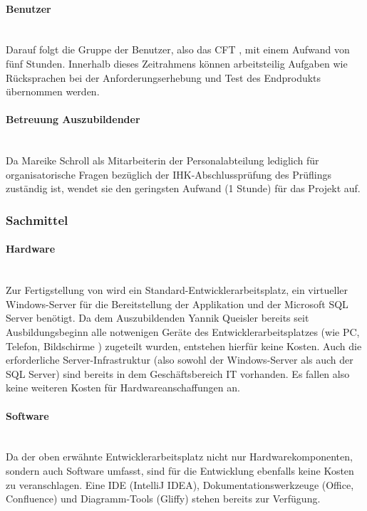 \paragraph{Benutzer} ~\\
\label{p:Benutzer}
Darauf folgt die Gruppe der Benutzer, also das \ac{CFT} \teamName, mit einem Aufwand von fünf Stunden. Innerhalb dieses Zeitrahmens können arbeitsteilig Aufgaben wie Rücksprachen bei der Anforderungserhebung und Test des Endprodukts übernommen werden.

\paragraph{Betreuung Auszubildender} ~\\
\label{p:Betreuung}
Da Mareike Schroll als Mitarbeiterin der Personalabteilung lediglich für organisatorische Fragen bezüglich der IHK-Abschlussprüfung des Prüflings zuständig ist, wendet sie den geringsten Aufwand (1 Stunde) für das Projekt auf.

\subsubsection{Sachmittel}
\label{sec:Sachmittel}

\paragraph{Hardware} ~\\
\label{p:Hardware}
Zur Fertigstellung von \projektName wird ein Standard-Entwicklerarbeitsplatz, ein virtueller Windows-Server für die Bereitstellung der Applikation und der Microsoft SQL Server benötigt. Da dem Auszubildenden Yannik Queisler bereits seit Ausbildungsbeginn alle notwenigen Geräte des Entwicklerarbeitsplatzes (wie PC, Telefon, Bildschirme \etc) zugeteilt wurden, entstehen hierfür keine Kosten. Auch die erforderliche Server-Infrastruktur (also sowohl der Windows-Server als auch der SQL Server) sind bereits in dem Geschäftsbereich IT vorhanden. Es fallen also keine weiteren Kosten für Hardwareanschaffungen an.

\paragraph{Software} ~\\
\label{p:Software}
Da der oben erwähnte Entwicklerarbeitsplatz nicht nur Hardwarekomponenten, sondern auch Software umfasst, sind für die Entwicklung ebenfalls keine Kosten zu veranschlagen. Eine \ac{IDE} (IntelliJ IDEA), Dokumentationswerkzeuge (Office, Confluence) und Diagramm-Tools (Gliffy) stehen bereits zur Verfügung.

